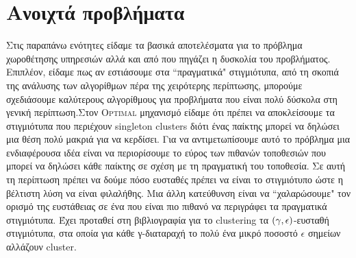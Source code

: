 \section{Ανοιχτά προβλήματα}

Στις παραπάνω ενότητες είδαμε τα βασικά αποτελέσματα για το πρόβλημα χωροθέτησης υπηρεσιών αλλά και από που πηγάζει η δυσκολία του προβλήματος. Επιπλέον, είδαμε πως αν εστιάσουμε στα ``πραγματικά" στιγμιότυπα, από τη σκοπιά της ανάλυσης των αλγορίθμων πέρα της χειρότερης περίπτωσης, μπορούμε σχεδιάσουμε καλύτερους αλγορίθμους για προβλήματα που είναι πολύ δύσκολα στη γενική περίπτωση.Στον \textsc{Optimal} μηχανισμό είδαμε ότι πρέπει να αποκλείσουμε τα στιγμιότυπα που περιέχουν singleton clusters διότι ένας παίκτης μπορεί να δηλώσει μια θέση πολύ μακριά για να κερδίσει. Για να αντιμετωπίσουμε αυτό το πρόβλημα μια ενδιαφέρουσα ιδέα είναι να περιορίσουμε το εύρος των πιθανών τοποθεσιών που μπορεί να δηλώσει κάθε παίκτης σε σχέση με τη πραγματική του τοποθεσία. Σε αυτή τη περίπτωση πρέπει να δούμε πόσο ευσταθές πρέπει να είναι το στιγμιότυπο ώστε η βέλτιστη λύση να είναι φιλαλήθης. Μια άλλη κατεύθυνση είναι να ``χαλαρώσουμε" τον ορισμό της ευστάθειας σε ένα που είναι πιο πιθανό να περιγράφει τα πραγματικά στιγμιότυπα. Έχει προταθεί στη βιβλιογραφία για το clustering τα $(\gamma,\epsilon)$-ευσταθή στιγμιότυπα, στα οποία  για κάθε γ-διαταραχή το πολύ ένα μικρό ποσοστό $\epsilon$ σημείων αλλάζουν cluster.